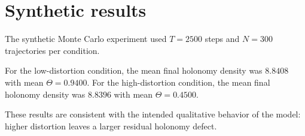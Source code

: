 \section{Synthetic results}

The synthetic Monte Carlo experiment used $T=2500$ steps and
$N=300$ trajectories per condition.

For the low-distortion condition, the mean final holonomy density was
$8.8408$ with mean $\Theta=0.9400$.
For the high-distortion condition, the mean final holonomy density was
$8.8396$ with mean $\Theta=0.4500$.

These results are consistent with the intended qualitative behavior of the model:
higher distortion leaves a larger residual holonomy defect.

